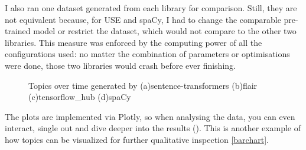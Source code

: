 \documentclass[12pt,MSc,a4paper,oneside]{muthesis}
\begin{document}
    I also ran one dataset generated from each library for comparison. Still, they are not equivalent because, for USE and spaCy, I had to change the comparable pre-trained model or restrict the dataset, which would not compare to the other two libraries. This measure was enforced by the computing power of all the configurations used: no matter the combination of parameters or optimisations were done, those two libraries would crash before ever finishing.

    \begin{figure}[t]
      \centering
      \caption{Topics over time generated by (a)sentence-transformers (b)flair (c)tensorflow\_hub (d)spaCy}
      \label{fig:foobar}
    \end{figure}

    The plots are implemented via Plotly, so when analysing the data, you can even interact, single out and dive deeper into the results (\cite{bertopic-online}). This is another example of how topics can be visualized for further qualitative inspection \ref{barchart}.
\end{document}
